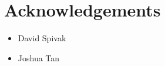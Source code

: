 
\section{Acknowledgements}

\begin{itemize}
	\item David Spivak
	\item Joshua Tan
\end{itemize}


\vfill
